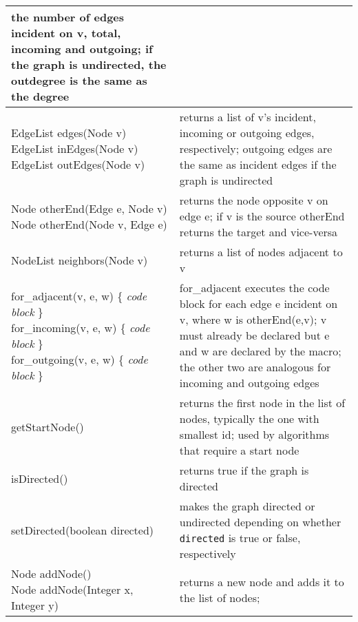 \begin{table}
\begin{tabular}{| m{} | m{} |}
    the number of edges incident on \textsf{v}, total, incoming and outgoing;
    if the graph is undirected, the outdegree is the same as the degree
    \\ \hline
    \shortstack[l]{
      \textsf{EdgeList edges(Node v)}\\
      \textsf{EdgeList inEdges(Node v)}\\
      \textsf{EdgeList outEdges(Node v)}
    }
    &
    returns a list of \textsf{v}'s
    incident, incoming or outgoing edges, respectively;
    outgoing edges are the same as incident edges if the graph is undirected 
    \\ \hline
    \shortstack[l]{
      \textsf{Node otherEnd(Edge e, Node v)}\\
      \textsf{Node otherEnd(Node v, Edge e)}
    }
    &
    returns the node opposite \textsf{v} on edge \textsf{e};
    if \textsf{v} is the source \textsf{otherEnd} returns the target and
    vice-versa
    \\ \hline
    \textsf{NodeList neighbors(Node v)}
    &
    returns a list of nodes adjacent to \textsf{v}
    \\ \hline
    \shortstack[l]{
      \textsf{for\_adjacent(v, e, w) \{ \emph{code block} \}} \\
      \textsf{for\_incoming(v, e, w) \{ \emph{code block} \}} \\ 
      \textsf{for\_outgoing(v, e, w) \{ \emph{code block} \}}
    }
    &
    \textsf{for\_adjacent} executes the code block for each edge \textsf{e}
    incident on \textsf{v}, where \textsf{w} is \textsf{otherEnd(e,v)};
    \textsf{v} must already be declared but \textsf{e} and \textsf{w} are
    declared by the macro;
    the other two are analogous for incoming and outgoing edges 
    \\ \hline
    \textsf{getStartNode()}
    &
    returns the first node in the list of nodes, typically the one with smallest id;
    used by algorithms that require a start node
    \\ \hline
    \textsf{isDirected()}
    &
    returns true if the graph is directed
    \\ \hline
    \textsf{setDirected(boolean directed)}
    &
    makes the graph directed or undirected depending on whether \texttt{directed}
    is true or false, respectively
    \\ \hline
    \shortstack[l]{
      \textsf{Node addNode()}\\
      \textsf{Node addNode(Integer x, Integer y)}
    }
    &
    returns a new node and adds it to the list of nodes;

\end{tabular}
\end{table}
